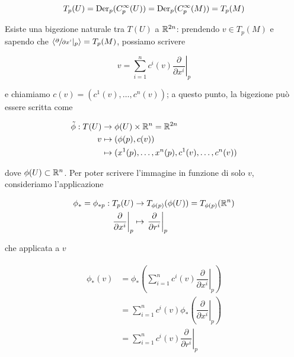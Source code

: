\begin{equation}
	T_{p}(U) = \operatorname{Der}_{p}(C_{p}^{\infty}(U)) = \operatorname{Der}_{p}(C_{p}^{\infty}(M)) = T_{p}(M)
\end{equation}

Esiste una bigezione naturale tra $ T(U) $ a $ \mathbb{R}^{2n} $: prendendo $ v \in T_{p}(M) $ e sapendo che $ \langle \sfrac{\partial}{\partial x^{i}} |_{p} \rangle = T_{p}(M) $, possiamo scrivere

\begin{equation}
	v = \sum_{i=1}^{n} c^{i}(v) \left. \dfrac{\partial}{\partial x^{i}} \right|_{p}
\end{equation}

e chiamiamo $ c(v) = (c^{1}(v),\dots,c^{n}(v)) $; a questo punto, la bigezione può essere scritta come

\begin{align}
	\begin{split}
		\tilde{\phi} : T(U) &\to \phi(U) \times \mathbb{R}^{n} = \mathbb{R}^{2n}\\
		v &\mapsto (\phi(p),c(v))\\
		&\mapsto (x^{1}(p),\dots,x^{n}(p),c^{1}(v),\dots,c^{n}(v))
	\end{split}
\end{align}

dove $ \phi(U) \subset \mathbb{R}^{n} $. Per poter scrivere l'immagine in funzione di solo $ v $, consideriamo l'applicazione

\begin{align}
	\begin{split}
		\phi_{*} = \phi_{*p} : T_{p}(U) &\to T_{\phi(p)}(\phi(U)) =  T_{\phi(p)}(\mathbb{R}^{n})\\
		\left. \dfrac{\partial}{\partial x^{i}} \right|_{p} &\mapsto \left. \dfrac{\partial}{\partial r^{i}} \right|_{p}
	\end{split}
\end{align}

che applicata a $ v $

\begin{align}
	\begin{split}
		\phi_{*}(v) &= \phi_{*} \left( \sum_{i=1}^{n} c^{i}(v) \left. \dfrac{\partial}{\partial x^{i}} \right|_{p} \right)\\
		&= \sum_{i=1}^{n} c^{i}(v) \phi_{*} \left( \left. \dfrac{\partial}{\partial x^{i}} \right|_{p} \right)\\
		&= \sum_{i=1}^{n} c^{i}(v) \left. \dfrac{\partial}{\partial r^{i}} \right|_{p}
	\end{split}
\end{align}

